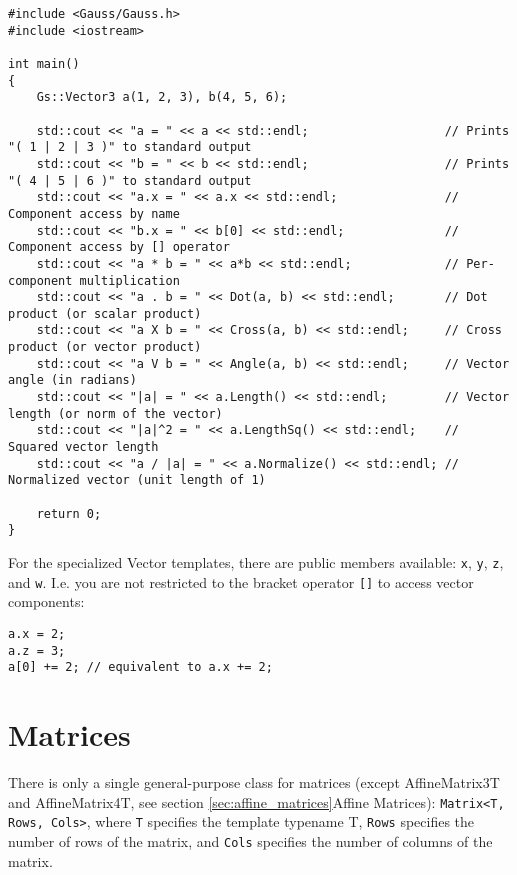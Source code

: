 \documentclass{article}
\begin{document}
\begin{lstlisting}
#include <Gauss/Gauss.h>
#include <iostream>

int main()
{
	Gs::Vector3 a(1, 2, 3), b(4, 5, 6);
	
	std::cout << "a = " << a << std::endl;                   // Prints "( 1 | 2 | 3 )" to standard output
	std::cout << "b = " << b << std::endl;                   // Prints "( 4 | 5 | 6 )" to standard output
	std::cout << "a.x = " << a.x << std::endl;               // Component access by name
	std::cout << "b.x = " << b[0] << std::endl;              // Component access by [] operator
	std::cout << "a * b = " << a*b << std::endl;             // Per-component multiplication
	std::cout << "a . b = " << Dot(a, b) << std::endl;       // Dot product (or scalar product)
	std::cout << "a X b = " << Cross(a, b) << std::endl;     // Cross product (or vector product)
	std::cout << "a V b = " << Angle(a, b) << std::endl;     // Vector angle (in radians)
	std::cout << "|a| = " << a.Length() << std::endl;        // Vector length (or norm of the vector)
	std::cout << "|a|^2 = " << a.LengthSq() << std::endl;    // Squared vector length
	std::cout << "a / |a| = " << a.Normalize() << std::endl; // Normalized vector (unit length of 1)
	
	return 0;
}
\end{lstlisting}
For the specialized Vector templates, there are public members available: \texttt{x}, \texttt{y}, \texttt{z}, and \texttt{w}.
I.e. you are not restricted to the bracket operator \texttt{[]} to access vector components:
\begin{lstlisting}
a.x = 2;
a.z = 3;
a[0] += 2; // equivalent to a.x += 2;
\end{lstlisting}



\newpage

\section*{Matrices}

There is only a single general-purpose class for matrices
(except AffineMatrix3T and AffineMatrix4T, see section \ref{sec:affine_matrices}{Affine Matrices}):
\texttt{Matrix<T, Rows, Cols>}, where \texttt{T} specifies the template typename T, \texttt{Rows} specifies the
number of rows of the matrix, and \texttt{Cols} specifies the number of columns of the matrix.
\end{document}
